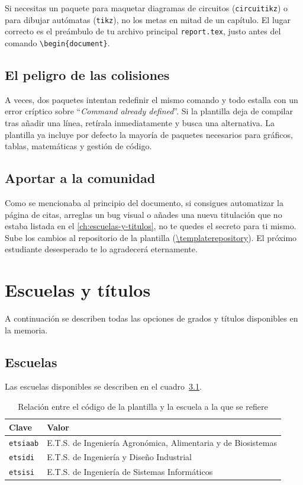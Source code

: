 Si necesitas un paquete para maquetar diagramas de circuitos (\texttt{circuitikz}) o para dibujar autómatas (\texttt{tikz}), no los metas en mitad de un capítulo. El lugar correcto es el preámbulo de tu archivo principal \texttt{report.tex}, justo antes del comando \lstinline|\|\lstinline|begin|\lstinline|{document}|.

\section{El peligro de las colisiones}

A veces, dos paquetes intentan redefinir el mismo comando y todo estalla con un error críptico sobre \enquote{\textit{Command already defined}}. Si la plantilla deja de compilar tras añadir una línea, retírala inmediatamente y busca una alternativa. La plantilla ya incluye por defecto la mayoría de paquetes necesarios para gráficos, tablas, matemáticas y gestión de código.

\section{Aportar a la comunidad}

Como se mencionaba al principio del documento, si consigues automatizar la página de citas, arreglas un bug visual o añades una nueva titulación que no estaba listada en el \autoref{ch:escuelas-y-titulos}, no te quedes el secreto para ti mismo. Sube los cambios al repositorio de la plantilla (\url{\templaterepository}). El próximo estudiante desesperado te lo agradecerá eternamente.


\chapter{Escuelas y títulos}
\label{ch:escuelas-y-titulos}

A continuación se describen todas las opciones de grados y títulos disponibles en la memoria.

\section{Escuelas}

Las escuelas disponibles se describen en el cuadro~\ref{tbl:schools}.

\begin{table}
    \centering
    \begin{tabularx}{\textwidth}{@{}lX@{}}
        \toprule
        \textbf{Clave}   & \textbf{Valor} \\
        \midrule
        \texttt{etsiaab} & E.T.S. de Ingeniería Agronómica, Alimentaria y de Biosistemas \\
        \texttt{etsidi}  & E.T.S. de Ingeniería y Diseño Industrial \\
        \texttt{etsisi}  & E.T.S. de Ingeniería de Sistemas Informáticos \\
        \bottomrule
    \end{tabularx}
    \caption{\label{tbl:schools} Relación entre el código de la plantilla y la escuela a la que se refiere}
\end{table}

